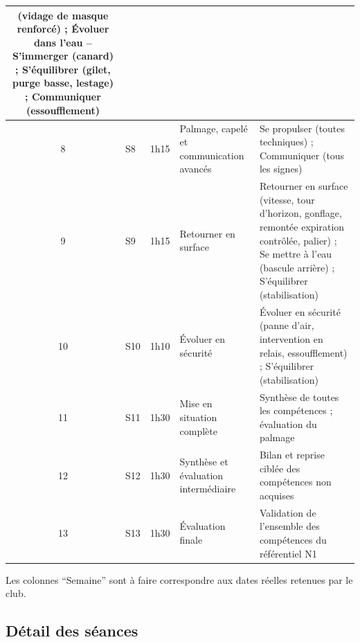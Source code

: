 \begin{longtable}{|c|p{2cm}|c|p{4.3cm}|p{5cm}|}
    (vidage de masque renforcé) ; Évoluer dans l'eau -- S'immerger (canard) ;
    S'équilibrer (gilet, purge basse, lestage) ; Communiquer (essoufflement) \\ \hline
  8 & S8 & 1h15 & Palmage, capelé et communication avancés &
    Se propulser (toutes techniques) ; Communiquer (tous les signes) \\ \hline
  9 & S9 & 1h15 & Retourner en surface &
    Retourner en surface (vitesse, tour d'horizon, gonflage, remontée expiration contrôlée,
    palier) ; Se mettre à l'eau (bascule arrière) ; S'équilibrer (stabilisation) \\ \hline
  10 & S10 & 1h10 & Évoluer en sécurité &
    Évoluer en sécurité (panne d'air, intervention en relais, essoufflement) ;
    S'équilibrer (stabilisation) \\ \hline
  11 & S11 & 1h30 & Mise en situation complète &
    Synthèse de toutes les compétences ; évaluation du palmage \\ \hline
  12 & S12 & 1h30 & Synthèse et évaluation intermédiaire &
    Bilan et reprise ciblée des compétences non acquises \\ \hline
  13 & S13 & 1h30 & Évaluation finale &
    Validation de l'ensemble des compétences du référentiel N1 \\ \hline
\end{longtable}

Les colonnes ``Semaine'' sont à faire correspondre aux dates réelles retenues par le club.

\subsection{Détail des séances}

